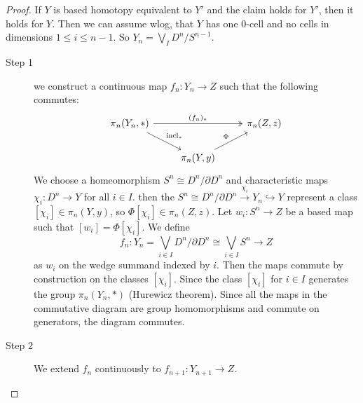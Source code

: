 \documentclass[language=english]{TemplateLecture}
\begin{document}
\begin{proof}
    If \(Y\) is based homotopy equivalent to \(Y'\) and the claim holds for \(Y'\), then it holds for \(Y\). Then we can assume wlog, that \(Y\) has one \(0\)-cell and no cells in dimensions \(1\leq i\leq n-1\). So \(Y_n = \bigvee_I D^n/S^{n-1}\).
    \begin{description}
        \item[Step 1] we construct a continuous map \(f_n\colon Y_n\to Z\) such that the following commutes:
        \[\begin{tikzcd}
            \pi_n(Y_n, *)\ar[rr, "(f_n)_*", two heads]\ar[rd, "\incl_*"] && \pi_n(Z,z) \\
            & \pi_n(Y,y) \ar[ru, "\Phi"] 
        \end{tikzcd}\]
        We choose a homeomorphism \(S^n \cong D^n/\partial D^n\) and characteristic maps \(\chi_i\colon D^n \to Y\) for all \(i\in I\). then the \(S^n \cong D^n/\partial D^n\xrightarrow{\chi_i} Y_n \hookrightarrow Y\) represent a class \([\chi_i]\in \pi_n(Y, y)\), so \(\Phi[\chi_i] \in \pi_n(Z,z)\). Let \(w_i\colon S^n\to Z\) be a based map such that \([w_i] = \Phi[\chi_i]\). We define
        \[f_n\colon Y_n = \bigvee_{i\in I} D^n/\partial D^n \cong \bigvee_{i\in I} S^n \to Z\]
        as \(w_i\) on the wedge summand indexed by \(i\). Then the maps commute by construction on the classes \([\chi_i]\). Since the class \([\chi_i]\) for \(i\in I\) generates the group \(\pi_n(Y_n, *)\) (Hurewicz theorem). Since all the maps in the commutative diagram are group homomorphisms and commute on generators, the diagram commutes.
        \item[Step 2] We extend \(f_n\) continuously to \(f_{n+1}\colon Y_{n+1} \to Z\).
        

\end{description}
\end{proof}
\end{document}
